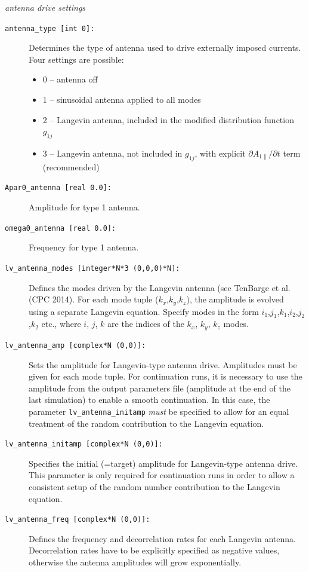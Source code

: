 \documentclass[12pt]{article}
\begin{document}
{\noindent\em antenna drive settings}
\begin{description}
\item[\hypertarget{antenna_type}{\tt antenna\_type [int 0]:}] Determines the type of antenna used to 
drive externally imposed currents. Four settings are possible: 
\begin{itemize}
\item 0 -- antenna off
\item 1 -- sinusoidal antenna applied to all modes
\item 2 -- Langevin antenna, included in the modified distribution function $g_{1j}$
\item 3 -- Langevin antenna, not included in $g_{1j}$, with explicit $\partial A_{1\|}/\partial t$ term (recommended)
\end{itemize}
\item[\hypertarget{Apar0_antenna}{\tt Apar0\_antenna [real 0.0]:}] Amplitude for type 1 antenna.
\item[\hypertarget{omega0_antenna}{\tt omega0\_antenna [real 0.0]:}] Frequency for type 1 antenna.
\item[\hypertarget{lv_antenna_modes}{\tt lv\_antenna\_modes [integer*N*3 (0,0,0)*N]:}] Defines the 
modes driven by the Langevin antenna (see TenBarge et al. (CPC 2014). For each mode tuple ($k_x$,$k_y$,$k_z$), 
the amplitude is evolved using a separate Langevin equation. Specify modes in the form 
$i_1$,$j_1$,$k_1$,$i_2$,$j_2$,$k_2$ etc., where $i$, $j$, $k$ are the indices of the $k_x$, $k_y$, $k_z$ modes. 
\item[\hypertarget{lv_antenna_amp}{\tt lv\_antenna\_amp [complex*N (0,0)]:}] Sets the amplitude for 
Langevin-type antenna drive. Amplitudes must be given for each mode tuple. For continuation runs, it is 
necessary to use the amplitude from the output parameters file (amplitude at the end of the last simulation) 
to enable a smooth continuation. In this case, the parameter {\tt lv\_antenna\_initamp} {\em must} be 
specified to allow for an equal treatment of the random contribution to the Langevin equation. 
\item[\hypertarget{lv_antenna_initamp}{\tt lv\_antenna\_initamp [complex*N (0,0)]:}] Specifies the initial 
(=target) amplitude for Langevin-type antenna drive. This parameter is only required for continuation runs in order 
to allow a consistent setup of the random number contribution to the Langevin equation.
\item[\hypertarget{lv_antenna_freq}{\tt lv\_antenna\_freq [complex*N (0,0)]:}] Defines the frequency and 
decorrelation rates for each Langevin antenna. Decorrelation rates have to be explicitly specified as 
negative values, otherwise the antenna amplitudes will grow exponentially. 
\end{description}
\end{document}
